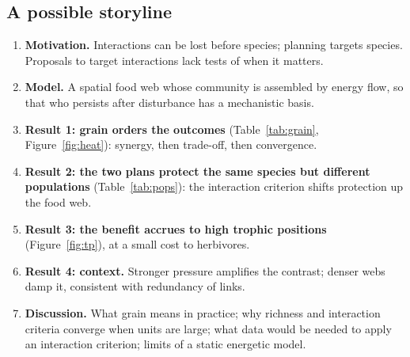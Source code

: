 \documentclass[11pt,a4paper]{article}
\begin{document}
\subsection{A possible storyline}
\begin{enumerate}
\item \textbf{Motivation.} Interactions can be lost before species; planning targets species. Proposals to
target interactions lack tests of when it matters.
\item \textbf{Model.} A spatial food web whose community is assembled by energy flow, so that who persists
after disturbance has a mechanistic basis.
\item \textbf{Result 1: grain orders the outcomes} (Table~\ref{tab:grain}, Figure~\ref{fig:heat}): synergy,
then trade-off, then convergence.
\item \textbf{Result 2: the two plans protect the same species but different populations}
(Table~\ref{tab:pops}): the interaction criterion shifts protection up the food web.
\item \textbf{Result 3: the benefit accrues to high trophic positions} (Figure~\ref{fig:tp}), at a small
cost to herbivores.
\item \textbf{Result 4: context.} Stronger pressure amplifies the contrast; denser webs damp it, consistent
with redundancy of links.
\item \textbf{Discussion.} What grain means in practice; why richness and interaction criteria converge
when units are large; what data would be needed to apply an interaction criterion; limits of a static
energetic model.
\end{enumerate}
\end{document}
